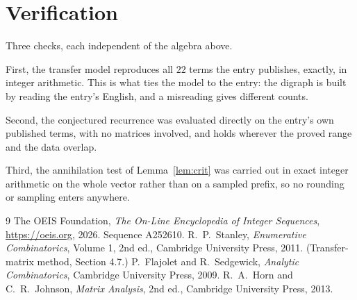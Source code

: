 \documentclass[11pt,a4paper]{article}
\theoremstyle{plain}
\theoremstyle{definition}
\begin{document}
\section{Verification}

Three checks, each independent of the algebra above.

First, the transfer model reproduces all $22$ terms the entry publishes, exactly, in
integer arithmetic. This is what ties the model to the entry: the digraph is built by reading
the entry's English, and a misreading gives different counts.

Second, the conjectured recurrence was evaluated directly on the entry's own published terms,
with no matrices involved, and holds wherever the proved range and the data overlap.

Third, the annihilation test of Lemma~\ref{lem:crit} was carried out in exact integer
arithmetic on the whole vector rather than on a sampled prefix, so no rounding or sampling
enters anywhere.

\begin{thebibliography}{9}
 The OEIS Foundation, \emph{The On-Line Encyclopedia of Integer
Sequences}, \url{https://oeis.org}, 2026. Sequence A252610.
 R.~P.~Stanley, \emph{Enumerative Combinatorics}, Volume 1, 2nd ed.,
Cambridge University Press, 2011. (Transfer-matrix method, Section 4.7.)
 P.~Flajolet and R.~Sedgewick, \emph{Analytic Combinatorics}, Cambridge
University Press, 2009.
 R.~A.~Horn and C.~R.~Johnson, \emph{Matrix Analysis}, 2nd ed., Cambridge
University Press, 2013.
\end{thebibliography}
\end{document}
